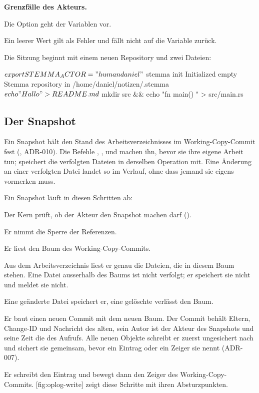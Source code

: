 \startinfobox
{\bf Grenzfälle des Akteurs.}
\startitemize
\item Die Option geht der Variablen vor.
\item Ein leerer Wert gilt als Fehler und fällt nicht auf die Variable zurück.
\stopitemize
\stopinfobox

Die Sitzung beginnt mit einem neuen Repository und zwei Dateien:

\starttyping
$ export STEMMA_ACTOR="human daniel"
$ stemma init
Initialized empty Stemma repository in /home/daniel/notizen/.stemma
$ echo "Hallo" > README.md
$ mkdir src && echo "fn main() {}" > src/main.rs
\stoptyping

\subsection{Der Snapshot}

Ein Snapshot hält den Stand des Arbeitsverzeichnisses im Working-Copy-Commit fest
(, ADR-010).
Die Befehle , ,  und 
machen ihn, bevor sie ihre eigene Arbeit tun;
 speichert die verfolgten Dateien in derselben Operation mit.
Eine Änderung an einer verfolgten Datei landet so im Verlauf,
ohne dass jemand sie eigens vormerken muss.

Ein Snapshot läuft in diesen Schritten ab:

\startitemize[n]
\item Der Kern prüft, ob der Akteur den Snapshot machen darf ().
\item Er nimmt die Sperre der Referenzen.
\item Er liest den Baum des Working-Copy-Commits.
\item Aus dem Arbeitsverzeichnis liest er genau die Dateien, die in diesem Baum stehen.
Eine Datei ausserhalb des Baums ist nicht verfolgt;
er speichert sie nicht und meldet sie nicht.
\item Eine geänderte Datei speichert er, eine gelöschte verlässt den Baum.
\item Er baut einen neuen Commit mit dem neuen Baum.
Der Commit behält Eltern, Change-ID und Nachricht des alten,
sein Autor ist der Akteur des Snapshots und seine Zeit die des Aufrufs.
Alle neuen Objekte schreibt er zuerst ungesichert nach 
und sichert sie gemeinsam, bevor ein Eintrag oder ein Zeiger sie nennt (ADR-007).
\item Er schreibt den Eintrag und bewegt dann den Zeiger des Working-Copy-Commits.
[fig:oplog-write] zeigt diese Schritte mit ihren Absturzpunkten.
\stopitemize

